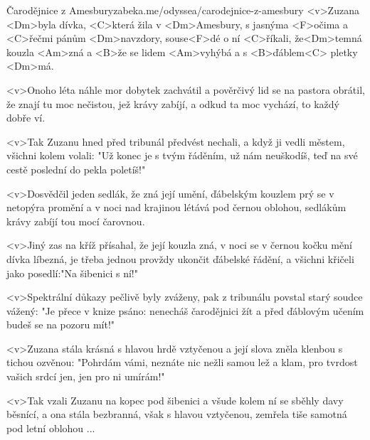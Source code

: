 \begin{song}[Asonance]{66}{Čarodějnice z Amesbury}{zabeka.me/odyssea/carodejnice-z-amesbury}
<v>Zuzana <Dm>byla dívka, <C>která žila v <Dm>Amesbury, 
s jasnýma <F>očima a <C>řečmi pánům <Dm>navzdory, 
souse<F>dé o ní <C>říkali, že<Dm>temná kouzla <Am>zná 
a <B>že se lidem <Am>vyhýbá a s <B>ďáblem<C> pletky <Dm>má. 

<v>Onoho léta náhle mor dobytek zachvátil 
a pověrčivý lid se na pastora obrátil, 
že znají tu moc nečistou, jež krávy zabíjí, 
a odkud ta moc vychází, to každý dobře ví. 

<v>Tak Zuzanu hned před tribunál předvést nechali, 
a když ji vedli městem, všichni kolem volali: 
"Už konec je s tvým řáděním, už nám neuškodíš, 
teď na své cestě poslední do pekla poletíš!" 

<v>Dosvědčil jeden sedlák, že zná její umění, 
ďábelským kouzlem prý se v netopýra promění 
a v noci nad krajinou létává pod černou oblohou, 
sedlákům krávy zabíjí tou mocí čarovnou. 

<v>Jiný zas na kříž přísahal, že její kouzla zná, 
v noci se v černou kočku mění dívka líbezná, 
je třeba jednou provždy ukončit ďábelské řádění, 
a všichni křičeli jako posedlí:"Na šibenici s ní!" 

<v>Spektrální důkazy pečlivě byly zváženy, 
pak z tribunálu povstal starý soudce vážený: 
"Je přece v knize psáno: nenecháš čarodějnici žít 
a před ďáblovým učením budeš se na pozoru mít!" 

<v>Zuzana stála krásná s hlavou hrdě vztyčenou 
a její slova zněla klenbou s tichou ozvěnou: 
"Pohrdám vámi, neznáte nic nežli samou lež a klam, 
pro tvrdost vašich srdcí jen, jen pro ni umírám!" 

<v>Tak vzali Zuzanu na kopec pod šibenici 
a všude kolem ní se sběhly davy běsnící, 
a ona stála bezbranná, však s hlavou vztyčenou, 
zemřela tiše samotná pod letní oblohou ...
\end{song}

